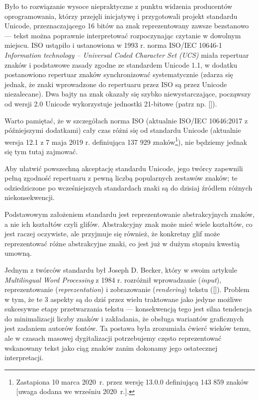 Było to rozwiązanie wysoce niepraktyczne z punktu widzenia producentów
oprogramowania, którzy przejęli inicjatywę i przygotowali projekt
standardu Unicode, przeznaczającego 16 bitów na znak reprezentowany
zawsze bezstanowo --- tekst można poprawnie interpretować
rozpoczynając czytanie w dowolnym miejscu. ISO ustąpiło i ustanowiona
w 1993 r. norma ISO/IEC 10646-1 \textit{Information technology --
  Universal Coded Character Set (UCS)} miała repertuar znaków i
podstawowe zasady zgodne ze standardem Unicode 1.1, w dodatku
postanowiono repertuar znaków synchronizować systematycznie (zdarza
się jednak, że znaki wprowadzone do repertuaru przez ISO są przez
Unicode niezalecane).  Dwa bajty na znak okazały się szybko
niewystarczające, począwszy od wersji 2.0 Unicode wykorzystuje
jednostki 21-bitowe (patrz np. [\cite{Blewitt16}]).

Warto pamiętać, że w szczegółach norma ISO (aktualnie ISO/IEC
10646:2017 z późniejszymi dodatkami) cały czas różni się od standardu
Unicode (aktualnie wersja 12.1 z 7 maja 2019 r. definiująca 137 929
znaków\footnote{Zastapiona 10 marca 2020~r. przez wersję 13.0.0
  definiującą 143 859 znaków [uwaga dodana we wrześniu 2020~r.].}),
nie będziemy jednak się tym tutaj zajmować.

Aby ułatwić powszechną akceptację standardu Unicode, jego twórcy
zapewnili pełną zgodność repertuaru z pewną liczbą popularnych
zestawów znaków; te odziedziczone po wcześniejszych standardach znaki
są do dzisiaj źródłem różnych niekonsekwencji.

Podstawowym założeniem standardu jest reprezentowanie abstrakcyjnych
znaków, a nie ich kształtów czyli glifów. Abstrakcyjny znak może mieć
wiele kształtów, co jest raczej oczywiste, ale przyjmuje się również,
że konkretny glif może reprezentować różne abstrakcyjne znaki, co jest
już w dużym stopniu kwestią umowną.

Jednym z twórców standardu był Joseph D. Becker, który w swoim
artykule \textit{Multilingual Word Processing} z 1984 r. rozróżnił
wprowadzanie (\textit{input}), reprezentowanie
(\textit{reprezentation}) i zobrazowanie (\textit{rendering}) tekstu
([\cite{Becker1984}]).
Problem w tym, że te 3 aspekty są do dziś przez wielu traktowane jako
jedyne możliwe sukcesywne etapy przetwarzania tekstu --- konsekwencją
tego jest silna tendencja do minimalizacji liczby znaków i zakładania,
że obsługa wariantów graficznych jest zadaniem autorów fontów. Ta
postawa była zrozumiała ćwierć wieków temu, ale w czasach masowej
dygitalizacji potrzebujemy często reprezentować wskanowany tekst jako
ciąg znaków zanim dokonamy jego ostatecznej interpretacji.

